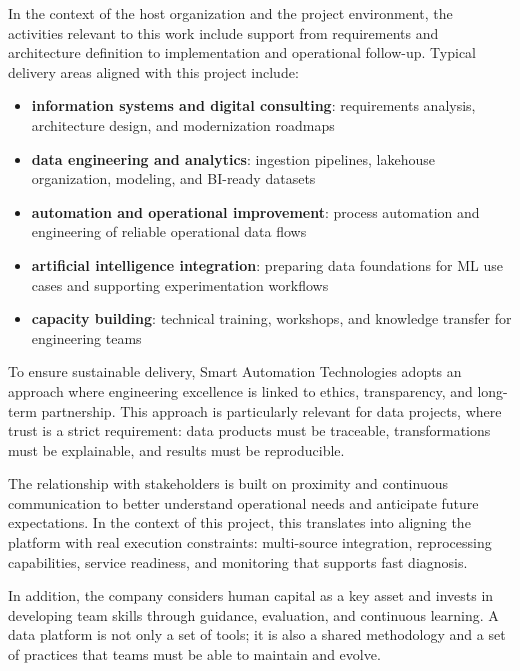 In the context of the host organization and the project environment, the activities relevant to this work include support from requirements and architecture definition to implementation and operational follow-up. Typical delivery areas aligned with this project include:
\begin{itemize}
    \item \textbf{information systems and digital consulting}: requirements analysis, architecture design, and modernization roadmaps
    \item \textbf{data engineering and analytics}: ingestion pipelines, lakehouse organization, modeling, and BI-ready datasets
    \item \textbf{automation and operational improvement}: process automation and engineering of reliable operational data flows
    \item \textbf{artificial intelligence integration}: preparing data foundations for ML use cases and supporting experimentation workflows
    \item \textbf{capacity building}: technical training, workshops, and knowledge transfer for engineering teams
\end{itemize}

To ensure sustainable delivery, Smart Automation Technologies adopts an approach where engineering excellence is linked to ethics, transparency, and long-term partnership. This approach is particularly relevant for data projects, where trust is a strict requirement: data products must be traceable, transformations must be explainable, and results must be reproducible.

The relationship with stakeholders is built on proximity and continuous communication to better understand operational needs and anticipate future expectations. In the context of this project, this translates into aligning the platform with real execution constraints: multi-source integration, reprocessing capabilities, service readiness, and monitoring that supports fast diagnosis.

In addition, the company considers human capital as a key asset and invests in developing team skills through guidance, evaluation, and continuous learning. A data platform is not only a set of tools; it is also a shared methodology and a set of practices that teams must be able to maintain and evolve.

